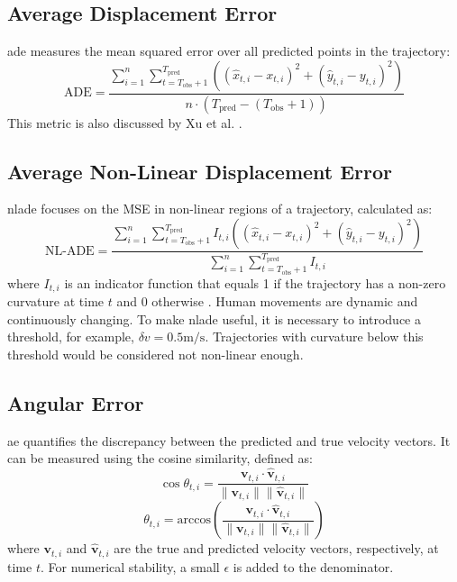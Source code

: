\subsection{Average Displacement Error}
\label{eq:ADE}
\gls{ade} measures the mean squared error over all predicted points in the trajectory:
\begin{equation}
\text{ADE} = \frac{\sum_{i=1}^n \sum_{t=T_{\text{obs}}+1}^{T_{\text{pred}}} \left( (\hat{x}_{t,i} - x_{t,i})^2 + (\hat{y}_{t,i} - y_{t,i})^2 \right)}{n \cdot (T_{\text{pred}} - (T_{\text{obs}} + 1))}
\end{equation}
This metric is also discussed by Xu et al. \cite{xu2018collision}.

\subsection{Average Non-Linear Displacement Error}
\label{eq:nl-ade}
\gls{nlade} focuses on the MSE in non-linear regions of a trajectory, calculated as:
\begin{equation}
\text{NL-ADE} = \frac{\sum_{i=1}^n \sum_{t=T_{\text{obs}}+1}^{T_{\text{pred}}} I_{t,i} \left( (\hat{x}_{t,i} - x_{t,i})^2 + (\hat{y}_{t,i} - y_{t,i})^2 \right)}{\sum_{i=1}^n \sum_{t=T_{\text{obs}}+1}^{T_{\text{pred}}} I_{t,i}}
\end{equation}
where \(I_{t,i}\) is an indicator function that equals 1 if the trajectory has a non-zero curvature at time \(t\) and 0 otherwise \cite{xu2018collision}. Human movements are dynamic and continuously changing. To make \gls{nlade} useful, it is necessary to introduce a threshold, for example, \(\delta v = 0.5 \text{m/s}\). Trajectories with curvature below this threshold would be considered not non-linear enough.

\subsection*{Angular Error}
\label{eq:angular error}
\gls{ae} quantifies the discrepancy between the predicted and true velocity vectors. It can be measured using the cosine similarity, defined as:
\begin{equation}
\cos \theta_{t,i} = \frac{\mathbf{v}_{t,i} \cdot \hat{\mathbf{v}}_{t,i}}{\|\mathbf{v}_{t,i}\| \|\hat{\mathbf{v}}_{t,i}\|}
\end{equation}
\begin{equation}
\theta_{t,i} = \text{arccos} \left( \frac{\mathbf{v}_{t,i} \cdot \hat{\mathbf{v}}_{t,i}}{\|\mathbf{v}_{t,i}\| \|\hat{\mathbf{v}}_{t,i}\|} \right)
\label{angular_error}
\end{equation}
where \(\mathbf{v}_{t,i}\) and \(\hat{\mathbf{v}}_{t,i}\) are the true and predicted velocity vectors, respectively, at time \(t\). For numerical stability, a small \(\epsilon\) is added to the denominator.


